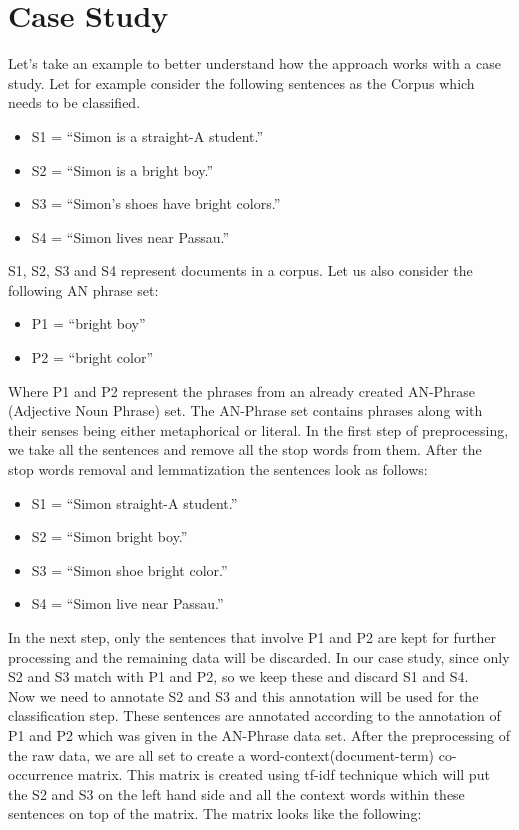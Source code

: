 \documentclass[a4paper]{article}
\begin{document}
\section{Case Study}
Let’s take an example to better understand how the approach works with a case study. Let for example consider the following sentences as the Corpus which needs to be classified.
\begin{itemize}
    \item S1 = “Simon is a straight-A student.”
    \item S2 = “Simon is a bright boy.”
    \item S3 = “Simon’s shoes have bright colors.”
    \item S4 = “Simon lives near Passau.”
\end{itemize}
S1, S2, S3 and S4 represent documents in a corpus. Let us also consider the following AN phrase set:

\begin{itemize}
    \item P1 = “bright boy”
    \item P2 = “bright color”
\end{itemize}

Where P1 and P2 represent the phrases from an already created AN-Phrase (Adjective Noun Phrase) set. The AN-Phrase set contains phrases along with their senses being either metaphorical or literal. In the first step of preprocessing, we take all the sentences and remove all the stop words from them. After the stop words removal and lemmatization the sentences look as follows:

\begin{itemize}
    \item S1 = “Simon straight-A student.”
    \item S2 = “Simon bright boy.”
    \item S3 = “Simon shoe bright color.”
    \item S4 = “Simon live near Passau.”
\end{itemize}

 In the next step, only the sentences that involve P1 and P2 are kept for further processing and the remaining data will be discarded. In our case study, since only S2 and S3 match with P1 and P2, so we keep these and discard S1 and S4.
\\
Now we need to annotate S2 and S3 and this annotation will be used for the classification step. These sentences are annotated according to the annotation of P1 and P2 which was given in the AN-Phrase data set. After the preprocessing of the raw data, we are all set to create a word-context(document-term) co-occurrence matrix. This matrix is created using tf-idf technique which will put the S2 and S3 on the left hand side and all the context words within these sentences on top of the matrix. The matrix looks like the following:
\end{document}
